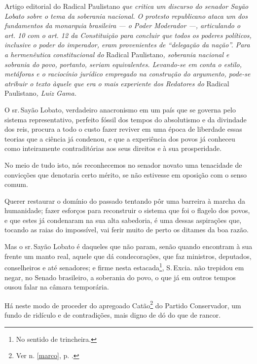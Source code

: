 \begin{didascalia}
Artigo editorial do Radical Paulistano \emph{que critica um discurso do
senador Sayão Lobato sobre o tema da soberania nacional. O protesto
republicano ataca um dos fundamentos da monarquia brasileira --- o Poder
Moderador ---, articulando o art. 10 com o art. 12 da Constituição para
concluir que todos os poderes políticos, inclusive o poder do imperador,
eram provenientes de ``delegação da nação''. Para a hermenêutica
constitucional do} Radical Paulistano\emph{, soberania nacional e
sobrania do povo, portanto, seriam equivalentes. Levando-se em conta o
estilo, metáforas e o raciocínio jurídico empregado na construção do
argumento, pode-se atribuir o texto àquele que era o mais experiente dos
Redatores do} Radical Paulistano\emph{, Luiz Gama.}
\end{didascalia}



O sr.\,Sayão Lobato, verdadeiro anacronismo em um país que se governa
pelo sistema representativo, perfeito fóssil dos tempos do absolutismo e
da divindade dos reis, procura a todo o custo fazer reviver em uma época
de liberdade essas teorias que a ciência já condenou, e que a
experiência dos povos já conheceu como inteiramente contraditórias aos
seus direitos e à sua prosperidade.

No meio de tudo isto, nós reconhecemos no senador novato uma tenacidade
de convicções que denotaria certo mérito, se não estivesse em oposição
com o senso comum.

Querer restaurar o domínio do passado tentando pôr uma barreira à marcha
da humanidade; fazer esforços para reconstruir o sistema que foi o
flagelo dos povos, e que estes já condenaram na sua alta sabedoria, é
uma dessas aspirações que, tocando as raias do impossível, vai ferir
muito de perto os ditames da boa razão.

Mas o sr.\,Sayão Lobato é daqueles que não param, senão quando encontram
à sua frente um manto real, aquele que dá condecorações, que faz
ministros, deputados, conselheiros e até senadores; e firme nesta
estacada\footnote{No sentido de trincheira.}, S.\,Excia. não trepidou
em negar, no Senado brasileiro, a soberania do povo, o que já em outros
tempos ousou falar na câmara temporária.

Há neste modo de proceder do apregoado Catão\footnote{Ver n. \ref{marco}, p. \pageref{marco}.} 
do Partido Conservador, um fundo de ridículo e de contradições, mais 
digno de dó do que de rancor.

